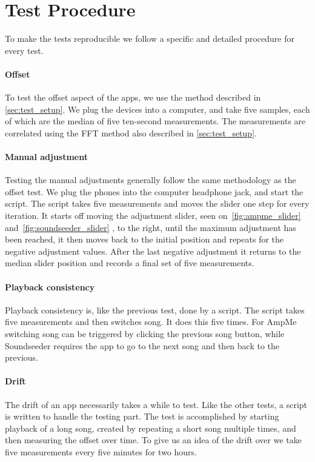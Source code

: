 \section{Test Procedure}\label{sec:test_procedure}
To make the tests reproducible we follow a specific and detailed
procedure for every test.

\paragraph{Offset}
To test the offset aspect of the apps, we use the method described in
\cref{sec:test_setup}. We plug the devices into a computer, and take
five samples, each of which are the median of five ten-second measurements. The
measurements are correlated using the \ac{FFT} method also described in
\cref{sec:test_setup}.

\paragraph{Manual adjustment}
Testing the manual adjustments generally follow the same methodology as
the offset test. We plug the phones into the computer headphone jack,
and start the script. The script takes five measurements and moves the
slider one step for every iteration. It starts off moving the adjustment
slider, seen on~\vref{fig:ampme_slider} and~\vref{fig:soundseeder_slider}
, to the right, until the maximum adjustment has
been reached, it then moves back to the initial position and repeats for
the negative adjustment values. After the last negative adjustment it
returns to the median slider position and records a final set of
five measurements.

\paragraph{Playback consistency}
Playback consistency is, like the previous test, done by a script. The
script takes five measurements and then switches song. It does this
five times. For AmpMe switching song can be triggered by clicking the
previous song button, while Soundseeder requires the app to go to the
next song and then back to the previous.

\paragraph{Drift}
The drift of an app necessarily takes a while to test. Like the other
tests, a script is written to handle the testing part. The test is
accomplished by starting playback of a long song, created by repeating
a short song multiple times, and then measuring the offset over time. To
give us an idea of the drift over we take five measurements every five minutes
for two hours.
